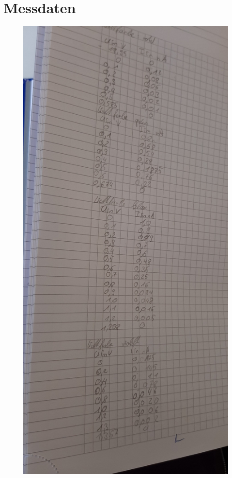\section{Messdaten}
\label{sec:Messdaten}

\begin{figure}[H]
    \centering
    \includegraphics{figures/Messdaten1.pdf}
\end{figure}

